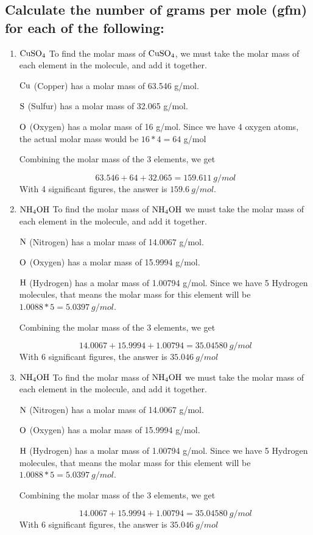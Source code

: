 \documentclass[11pt]{article}
\begin{document}
\subsection{Calculate the number of grams per mole (gfm) for each of the following:}
\label{sec:org13810a9}
\begin{enumerate}
\item \(\ce{CuSO4}\)
To find the molar mass of \(\ce{CuSO4}\), we must take the molar mass of
each element in the molecule, and add it together.

\(\ce{Cu}\) (Copper) has a molar mass of 63.546 g/mol.

\(\ce{S}\) (Sulfur) has a molar mass of 32.065 g/mol.

\(\ce{O}\) (Oxygen) has a molar mass of 16 g/mol. Since we have 4 oxygen
atoms, the actual molar mass would be \(16*4=64\) g/mol

Combining the molar mass of the 3 elements, we get

\begin{equation}
63.546+64+32.065=159.611\ g/mol
\end{equation}
With 4 significant figures, the answer is \textbf{\(159.6\ g/mol\)}.

\item \(\ce{NH4OH}\)
To find the molar mass of \(\ce{NH4OH}\) we must take the molar mass of each element in the molecule, and add it together.

\(\ce{N}\) (Nitrogen) has a molar mass of 14.0067 g/mol.

\(\ce{O}\) (Oxygen) has a molar mass of 15.9994 g/mol.

\(\ce{H}\) (Hydrogen) has a molar mass of 1.00794 g/mol. Since we have 5
Hydrogen molecules, that means the molar mass for this element will be
\(1.0088*5=5.0397\ g/mol\).

Combining the molar mass of the 3 elements, we get

\begin{equation}
14.0067+15.9994+1.00794=35.04580\ g/mol
\end{equation}
With 6 significant figures, the answer is \textbf{\(35.046\ g/mol\)}

\item \(\ce{NH4OH}\)
To find the molar mass of \(\ce{NH4OH}\) we must take the molar mass of each element in the molecule, and add it together.

\(\ce{N}\) (Nitrogen) has a molar mass of 14.0067 g/mol.

\(\ce{O}\) (Oxygen) has a molar mass of 15.9994 g/mol.

\(\ce{H}\) (Hydrogen) has a molar mass of 1.00794 g/mol. Since we have 5
Hydrogen molecules, that means the molar mass for this element will be
\(1.0088*5=5.0397\ g/mol\).

Combining the molar mass of the 3 elements, we get

\begin{equation}
14.0067+15.9994+1.00794=35.04580\ g/mol
\end{equation}
With 6 significant figures, the answer is \textbf{\(35.046\ g/mol\)}
\end{enumerate}
\end{document}
